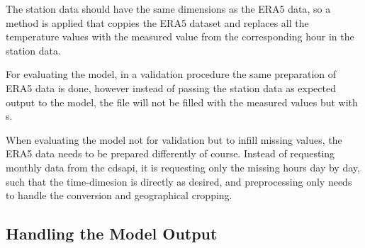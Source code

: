 The station data should have the same dimensions as the ERA5 data, so a method is applied that coppies the ERA5 dataset and replaces all the temperature values with the measured value from the corresponding hour in the station data.

For evaluating the model, in a validation procedure the same preparation of ERA5 data is done, however instead of passing the station data as expected output to the model, the file will not be filled with the measured values but with s.

When evaluating the model not for validation but to infill missing values, the ERA5 data needs to be prepared differently of course.
Instead of requesting monthly data from the cdsapi, it is requesting only the missing hours day by day, such that the time-dimesion is directly as desired, and preprocessing only needs to handle the conversion and geographical cropping.

\subsection{Handling the Model Output}

